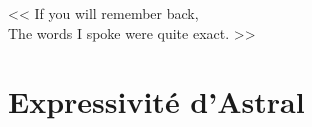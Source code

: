 \begin{savequote}[6cm]
<< If you will remember back,\\ The words I spoke were quite exact. >>
\end{savequote}

\chapter{Expressivité d'Astral}\label{chap:validation:expressivite}
\chaptertoc





